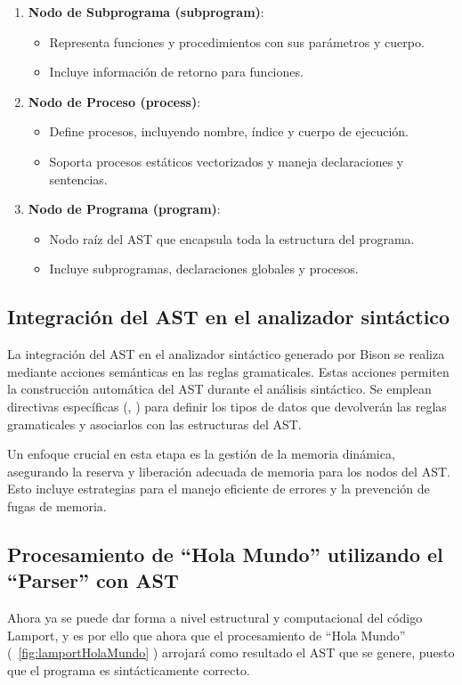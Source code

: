 \begin{enumerate}
    \item \textbf{Nodo de Subprograma (subprogram)}:
    \begin{itemize}
        \item Representa funciones y procedimientos con sus parámetros y cuerpo.
        \item Incluye información de retorno para funciones.
    \end{itemize}

    \item \textbf{Nodo de Proceso (process)}:
    \begin{itemize}
        \item Define procesos, incluyendo nombre, índice y cuerpo de ejecución.
        \item Soporta procesos estáticos vectorizados y maneja declaraciones y sentencias.
    \end{itemize}

    \item \textbf{Nodo de Programa (program)}:
    \begin{itemize}
        \item Nodo raíz del AST que encapsula toda la estructura del programa.
        \item Incluye subprogramas, declaraciones globales y procesos.
    \end{itemize}
\end{enumerate}


\subsection{Integración del AST en el analizador sintáctico}
La integración del AST en el analizador sintáctico generado por Bison se realiza mediante acciones semánticas en las reglas gramaticales. Estas acciones permiten la construcción automática del AST durante el análisis sintáctico. Se emplean directivas específicas (, ) para definir los tipos de datos que devolverán las reglas gramaticales y asociarlos con las estructuras del AST.

Un enfoque crucial en esta etapa es la gestión de la memoria dinámica, asegurando la reserva y liberación adecuada de memoria para los nodos del AST. Esto incluye estrategias para el manejo eficiente de errores y la prevención de fugas de memoria.

\subsection{Procesamiento de ``Hola Mundo'' utilizando el ``Parser'' con AST}
Ahora ya se puede dar forma a nivel estructural y computacional del código Lamport, y es por ello que ahora que el procesamiento de ``Hola Mundo'' (~\ref{fig:lamportHolaMundo} ) arrojará como resultado el AST que se genere, puesto que el programa es sintácticamente correcto.

